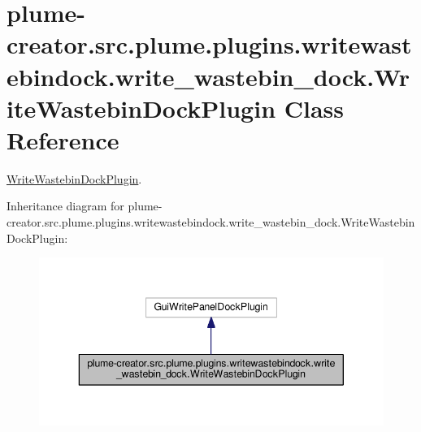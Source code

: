 \hypertarget{classplume-creator_1_1src_1_1plume_1_1plugins_1_1writewastebindock_1_1write__wastebin__dock_1_1_write_wastebin_dock_plugin}{}\section{plume-\/creator.src.\+plume.\+plugins.\+writewastebindock.\+write\+\_\+wastebin\+\_\+dock.\+Write\+Wastebin\+Dock\+Plugin Class Reference}
\label{classplume-creator_1_1src_1_1plume_1_1plugins_1_1writewastebindock_1_1write__wastebin__dock_1_1_write_wastebin_dock_plugin}


\hyperlink{classplume-creator_1_1src_1_1plume_1_1plugins_1_1writewastebindock_1_1write__wastebin__dock_1_1_write_wastebin_dock_plugin}{Write\+Wastebin\+Dock\+Plugin}.  




Inheritance diagram for plume-\/creator.src.\+plume.\+plugins.\+writewastebindock.\+write\+\_\+wastebin\+\_\+dock.\+Write\+Wastebin\+Dock\+Plugin\+:\nopagebreak
\begin{figure}[H]
\begin{center}
\leavevmode
\includegraphics[width=343pt]{classplume-creator_1_1src_1_1plume_1_1plugins_1_1writewastebindock_1_1write__wastebin__dock_1_1_ee873cad29936567769387246cbc3ca7}
\end{center}
\end{figure}


